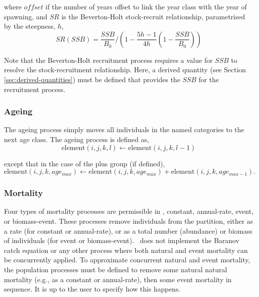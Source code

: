 where $offset$ if the number of years offset to link the year class with the year of spawning, and $SR$ is the Beverton-Holt stock-recruit relationship, parametrised by the steepness, $h$,
\begin{equation}
SR(SSB) = \frac{SSB}{B_0} / \left( 1-\frac{5h-1}{4h} \left( 1-\frac{SSB}{B_0} \right) \right)
\end{equation}

Note that the Beverton-Holt recruitment process requires a value for $SSB$ to resolve the stock-recruitment relationship. Here, a derived quantity (see Section \ref{sec:derived-quantities}) must be defined that provides the $SSB$ for the recruitment process.

\subsubsection{Ageing\label{sec:ageing}}

The ageing process simply moves all individuals in the named categories to the next age class. The ageing process is defined as,
\begin{equation}
  \text{element}(i,j,k,l) \leftarrow \text{element}(i,j,k,l-1)
\end{equation}

except that in the case of the plus group (if defined), 
\begin{equation}
  \text{element}(i,j,k,age_{max}) \leftarrow \text{element}(i,j,k,age_{max}) + \text{element}(i,j,k,age_{max-1}).
\end{equation}

\subsubsection{Mortality\label{sec:mortality}}

Four types of mortality processes are permissible in \SPM, constant, annual-rate, event, or biomass-event. These processes remove individuals from the partition, either as a rate (for constant or annual-rate), or as a total number (abundance) or biomass of individuals (for event or biomass-event). \SPM\ does not implement the Baranov catch equation or any other process where both natural and event mortality can be concurrently applied. To approximate concurrent natural and event mortality, the population processes must be defined to remove some natural natural mortality (e.g., as a constant or annual-rate), then some event mortality in sequence. It is up to the user to specify how this happens.

